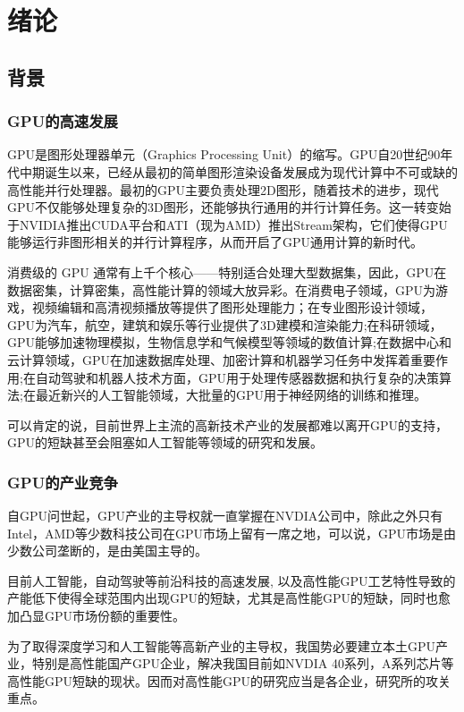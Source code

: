 \cleardoublepage

\section{绪论}

\subsection{背景}

\subsubsection{GPU的高速发展}

GPU是图形处理器单元（Graphics Processing Unit）的缩写。GPU自20世纪90年代中期诞生以来，已经从最初的简单图形渲染设备发展成为现代计算中不可或缺的高性能并行处理器。最初的GPU主要负责处理2D图形，随着技术的进步，现代GPU不仅能够处理复杂的3D图形，还能够执行通用的并行计算任务。这一转变始于NVIDIA推出CUDA平台和ATI（现为AMD）推出Stream架构，它们使得GPU能够运行非图形相关的并行计算程序，从而开启了GPU通用计算的新时代。

消费级的 GPU 通常有上千个核心——特别适合处理大型数据集，因此，GPU在数据密集，计算密集，高性能计算的领域大放异彩。在消费电子领域，GPU为游戏，视频编辑和高清视频播放等提供了图形处理能力；在专业图形设计领域，GPU为汽车，航空，建筑和娱乐等行业提供了3D建模和渲染能力;在科研领域，GPU能够加速物理模拟，生物信息学和气候模型等领域的数值计算;在数据中心和云计算领域，GPU在加速数据库处理、加密计算和机器学习任务中发挥着重要作用;在自动驾驶和机器人技术方面，GPU用于处理传感器数据和执行复杂的决策算法;在最近新兴的人工智能领域，大批量的GPU用于神经网络的训练和推理。

可以肯定的说，目前世界上主流的高新技术产业的发展都难以离开GPU的支持，GPU的短缺甚至会阻塞如人工智能等领域的研究和发展。

\subsubsection{GPU的产业竞争}

自GPU问世起，GPU产业的主导权就一直掌握在NVDIA公司中，除此之外只有Intel，AMD等少数科技公司在GPU市场上留有一席之地，可以说，GPU市场是由少数公司垄断的，是由美国主导的。


目前人工智能，自动驾驶等前沿科技的高速发展, 以及高性能GPU工艺特性导致的产能低下使得全球范围内出现GPU的短缺，尤其是高性能GPU的短缺，同时也愈加凸显GPU市场份额的重要性。

为了取得深度学习和人工智能等高新产业的主导权，我国势必要建立本土GPU产业，特别是高性能国产GPU企业，解决我国目前如NVDIA 40系列，A系列芯片等高性能GPU短缺的现状。因而对高性能GPU的研究应当是各企业，研究所的攻关重点。

